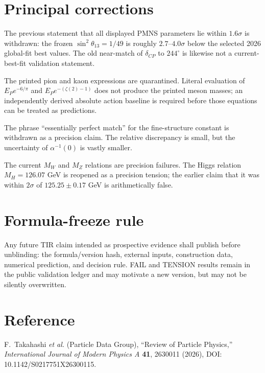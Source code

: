 \section{Principal corrections}
The previous statement that all displayed PMNS parameters lie within
$1.6\sigma$ is withdrawn: the frozen $\sin^2\theta_{13}=1/49$ is roughly
$2.7$--$4.0\sigma$ below the selected 2026 global-fit best values.  The old
near-match of $\delta_{CP}$ to $244^\circ$ is likewise not a current-best-fit
validation statement.

The printed pion and kaon expressions are quarantined.  Literal evaluation of
$E_Pe^{-6/\pi}$ and $E_Pe^{-(\zeta(2)-1)}$ does not produce the printed meson
masses; an independently derived absolute action baseline is required before
those equations can be treated as predictions.

The phrase ``essentially perfect match'' for the fine-structure constant is
withdrawn as a precision claim.  The relative discrepancy is small, but the
uncertainty of $\alpha^{-1}(0)$ is vastly smaller.

The current $M_W$ and $M_Z$ relations are precision failures.  The Higgs
relation $M_H=126.07$ GeV is reopened as a precision tension; the earlier claim
that it was within $2\sigma$ of $125.25\pm0.17$ GeV is arithmetically false.

\section{Formula-freeze rule}
Any future TIR claim intended as prospective evidence shall publish before
unblinding: the formula/version hash, external inputs, construction data,
numerical prediction, and decision rule.  FAIL and TENSION results remain in
the public validation ledger and may motivate a new version, but may not be
silently overwritten.

\section{Reference}
F.~Takahashi \emph{et al.} (Particle Data Group), ``Review of Particle
Physics,'' \emph{International Journal of Modern Physics A} \textbf{41},
2630011 (2026), DOI: 10.1142/S0217751X26300115.
